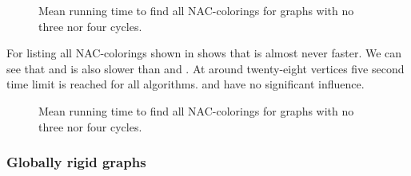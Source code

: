 \begin{figure}[thbp]
	\centering
	\scalebox{\BenchFigureScale}{}
	\caption[Mean runtime for graphs with no 3 nor 4 cycles (some)]{
		Mean running time to find all NAC-colorings for graphs with no three nor four cycles.}%
	\label{fig:graph_count_no_3_nor_4_cycles_first_runtime}
\end{figure}%

For listing all NAC-colorings shown
in 
shows that \NaiveCycles{} is almost never faster.
We can see that \None{} and \CyclesMatchChunks{} is also slower than
\Neighbors{} and \NeighborsDegree{}.
At around twenty-eight vertices five second time limit is reached for all algorithms.
\MergeLinear{} and \SharedVertices{} have no significant influence.
%
\begin{figure}[thbp]
	\centering
	\scalebox{\BenchFigureScale}{}
	\caption[Mean runtime for graphs with no 3 nor 4 cycles (all)]{
		Mean running time to find all NAC-colorings for graphs with no three nor four cycles.}%
	\label{fig:graph_count_no_3_nor_4_cycles_all_runtime}
\end{figure}%


\subsubsection*{Globally rigid graphs}

